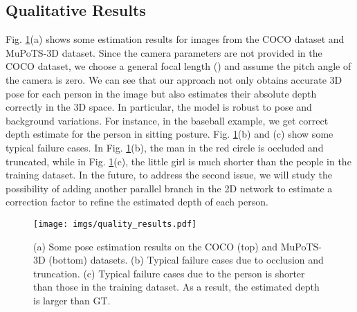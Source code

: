 \begin{table}
    \centering
    \caption{Impact of training data generation strategies. The metric is  (mm). We can see that by training a universal model, our method achieves smaller depth estimation errors than the model trained on a single camera.}
    \label{tab:experiment_random_view}
\end{table}

\subsection{Qualitative Results}
\label{subsec:qualitative}

Fig. \ref{fig:experiment_quality}(a) shows some estimation results for images from the COCO dataset and MuPoTS-3D dataset. Since the camera parameters are not provided in the COCO dataset, we choose a general focal length () and assume the pitch angle of the camera is zero. We can see that our approach not only obtains accurate 3D pose for each person in the image but also estimates their absolute depth correctly in the 3D space. In particular, the model is robust to pose and background variations. For instance, in the baseball example, we get correct depth estimate for the person in sitting posture. Fig. \ref{fig:experiment_quality}(b) and (c) show some typical failure cases. In Fig. \ref{fig:experiment_quality}(b), the man in the red circle is occluded and truncated, while in Fig. \ref{fig:experiment_quality}(c), the little girl is much shorter than the people in the training dataset. In the future, to address the second issue, we will study the possibility of adding another parallel branch in the 2D network to estimate a correction factor to refine the estimated depth of each person.



\begin{figure}[t]
	\centering
	\texttt{[image: imgs/quality\_results.pdf]}
    \caption{(a) Some pose estimation results on the COCO (top) and MuPoTS-3D (bottom) datasets. (b) Typical failure cases due to occlusion and truncation. (c) Typical failure cases due to the person is shorter than those in the training dataset. As a result, the estimated depth is larger than GT.}
	\label{fig:experiment_quality}
\end{figure}




